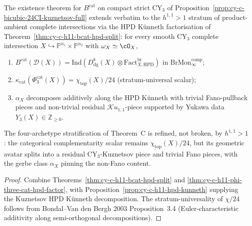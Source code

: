 \begin{corollary}
\label{cor:cy-c-h11-a103-extension}
The existence theorem for $B^{\mathrm{cat}}$ on compact strict CY$_3$
of Proposition~\ref{prop:cy-c-bicubic-24CI-kuznetsov-full} extends
verbatim to the $h^{1,1} > 1$ stratum of product-ambient complete
intersections via the HPD Künneth factorisation of
Theorem~\ref{thm:cy-c-h11-bcat-hpd-split}: for every smooth CY$_3$
complete intersection $X \hookrightarrow \mathbb P^{n_1} \times
\mathbb P^{n_2}$ with $\omega_X \simeq \cO_X$,
\begin{enumerate}[label=\textup{(\roman*)}]
 \item $B^{\mathrm{cat}}(\mathcal D(X)) =
 \mathrm{Ind}(D^b_{\mathrm{dg}}(X) \otimes
 \mathrm{Fact}^{\mathrm{br}}_{X, \mathrm{HPD}})$ in
 $\mathrm{BrMon}^{\mathrm{comp}}_\infty$;
 \item $\kappa_{\mathrm{cat}}(\Phi_3^{\mathrm{cat}}(X)) =
 \chi_{\mathrm{top}}(X)/24$ (stratum-universal scalar);
 \item $\alpha_X$ decomposes additively along the HPD Künneth with
 trivial Fano-pullback pieces and non-trivial residual
 $\mathcal{K}u_{1,1}$-piece supported by Yukawa data
 $Y_3(X) \in \mathbb Z_{\geq 0}$.
\end{enumerate}
The four-archetype stratification of Theorem~C is refined, not
broken, by $h^{1,1} > 1$: the categorical complementarity scalar
remains $\chi_{\mathrm{top}}(X)/24$, but its geometric avatar splits
into a residual CY$_3$-Kuznetsov piece and trivial Fano pieces, with
the gerbe class $\alpha_X$ pinning the non-Fano content.
\end{corollary}

\begin{proof}
Combine Theorems~\ref{thm:cy-c-h11-bcat-hpd-split} and
\ref{thm:cy-c-h11-phi-three-cat-hpd-factor}, with
Proposition~\ref{prop:cy-c-h11-hpd-kunneth} supplying the Kuznetsov
HPD Künneth decomposition. The stratum-universality of $\chi/24$
follows from Bondal--Van den Bergh 2003 Proposition~3.4
(Euler-characteristic additivity along semi-orthogonal decompositions).
\end{proof}


